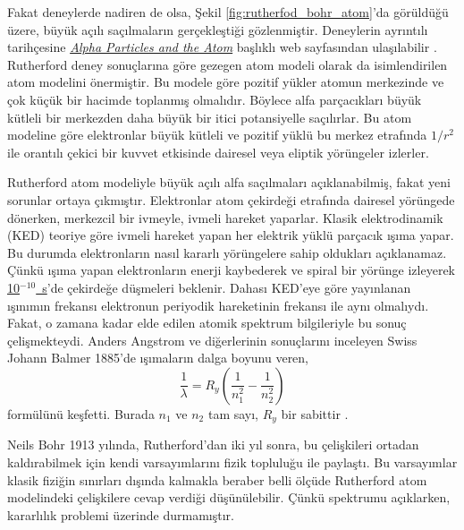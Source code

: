 \documentclass[a4paper,12pt, twoside]{article}
\begin{document}
Fakat deneylerde nadiren de olsa, Şekil \ref{fig:rutherfod_bohr_atom}'da görüldüğü üzere, büyük açılı saçılmaların gerçekleştiği gözlenmiştir. Deneylerin ayrıntılı tarihçesine {\it \href{https://history.aip.org/exhibits/rutherford/sections/alpha-particles-atom.html}{Alpha Particles and the Atom}} başlıklı web sayfasından ulaşılabilir \cite{web:rutherford_bohr_atom}. Rutherford deney sonuçlarına göre gezegen atom modeli olarak da isimlendirilen atom modelini önermiştir. Bu modele göre pozitif yükler atomun merkezinde ve çok küçük bir hacimde toplanmış olmalıdır. Böylece alfa parçacıkları büyük kütleli bir merkezden daha büyük bir itici potansiyelle saçılırlar. Bu atom modeline göre elektronlar büyük kütleli ve pozitif yüklü bu merkez etrafında $1/r^2$ ile orantılı çekici bir kuvvet etkisinde dairesel veya eliptik yörüngeler izlerler.

Rutherford atom modeliyle büyük açılı alfa saçılmaları açıklanabilmiş, fakat yeni sorunlar ortaya çıkmıştır. Elektronlar atom çekirdeği etrafında dairesel yörüngede dönerken, merkezcil bir ivmeyle, ivmeli hareket yaparlar. Klasik elektrodinamik (KED) teoriye göre ivmeli hareket yapan her elektrik yüklü parçacık ışıma yapar. Bu durumda elektronların nasıl kararlı yörüngelere sahip oldukları açıklanamaz. Çünkü ışıma yapan elektronların enerji kaybederek ve spiral bir yörünge izleyerek \href{http://bcs.wiley.com/he-bcs/Books?action=mininav&bcsId=1533&itemId=0471057002&assetId=17327&resourceId=1342}{10$^{-10}$~s}'de çekirdeğe düşmeleri beklenir. Dahası KED'eye göre yayınlanan ışınımın frekansı elektronun periyodik hareketinin frekansı ile aynı olmalıydı. Fakat, o zamana kadar elde edilen atomik spektrum bilgileriyle bu sonuç çelişmekteydi. Anders Angstrom ve diğerlerinin sonuçlarını inceleyen Swiss Johann Balmer 1885'de ışımaların dalga boyunu veren, 
\begin{equation}
\frac{1}{\lambda}= R_y \left( \frac{1}{n_1^2} - \frac{1}{n_2^2} \right)
\label{eq:balmer}
\end{equation}
formülünü keşfetti. Burada $n_1$ ve $n_2$ tam sayı, $R_y$ bir sabittir \cite{book:Gasiorowicz}.

Neils Bohr 1913 yılında, Rutherford'dan iki yıl sonra, bu çelişkileri ortadan kaldırabilmek için kendi varsayımlarını fizik topluluğu ile paylaştı. Bu varsayımlar klasik fiziğin sınırları dışında kalmakla beraber belli ölçüde Rutherford atom modelindeki çelişkilere cevap verdiği düşünülebilir. Çünkü spektrumu açıklarken, kararlılık problemi üzerinde durmamıştır.
\end{document}
